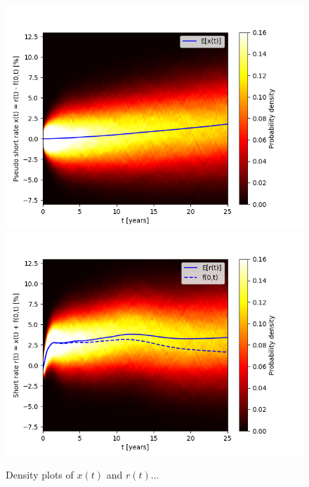 \begin{figure}
\centering
\includegraphics[scale=0.7]{figures/pseudo_short_rate_density.png}
\includegraphics[scale=0.7]{figures/short_rate_density.png}
\caption{Density plots of $x(t)$ and $r(t)$...}
\end{figure}

